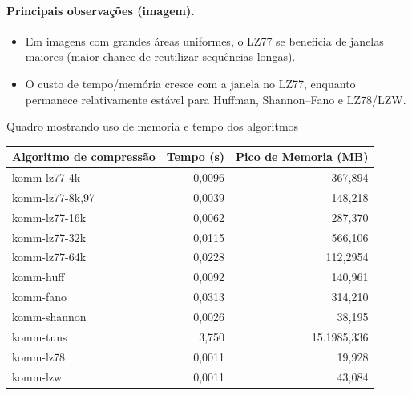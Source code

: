 \paragraph{Principais observações (imagem).}
\begin{itemize}
  \item Em imagens com grandes áreas uniformes, o LZ77 se beneficia de janelas maiores (maior chance de reutilizar sequências longas).
  \item O custo de tempo/memória cresce com a janela no LZ77, enquanto permanece relativamente estável para Huffman, Shannon--Fano e LZ78/LZW.
\end{itemize}

\begin{quadro}[ht]
\caption{Quadro mostrando uso de memoria e tempo dos algoritmos}\label{quadro:resultados-komm-smiley}
\begin{tabular}{|l|r|r|}
    \hline
    \textbf{Algoritmo de compressão}& \textbf{Tempo (s)}  & \textbf{Pico de Memoria (MB)} \\ \hline
    komm-lz77-4k & 0,0096 & 367,894 \\ \hline
    komm-lz77-8k,97 & 0,0039 & 148,218 \\ \hline
    komm-lz77-16k & 0,0062 & 287,370 \\ \hline
    komm-lz77-32k & 0,0115 & 566,106 \\ \hline
    komm-lz77-64k & 0,0228 & 112,2954 \\ \hline
    komm-huff & 0,0092 & 140,961 \\ \hline
    komm-fano & 0,0313 & 314,210 \\ \hline
    komm-shannon & 0,0026 & 38,195 \\ \hline
    komm-tuns & 3,750 & 15.1985,336 \\ \hline
    komm-lz78 & 0,0011 & 19,928 \\ \hline
    komm-lzw & 0,0011 & 43,084 \\ \hline

\end{tabular}
\fonteproprioautor
\end{quadro}

